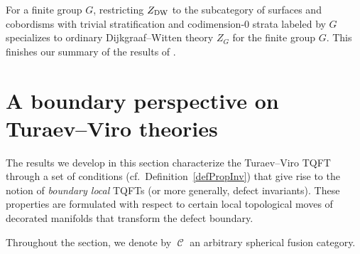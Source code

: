 \documentclass[10pt,a4paper]{amsart}
\DeclareMathOperator{\calc}{\mathcal{C}}
\numberwithin{equation}{section}
\theoremstyle{definition}
\begin{document}
For a finite group $G$, restricting $Z_{\rm DW}$ to the subcategory of surfaces and cobordisms with trivial stratification and codimension-0 strata labeled by $G$ specializes to ordinary Dijkgraaf--Witten theory $Z_G$ for the finite group $G$. This finishes our summary of the results of \cite{FMM}.

\section{A boundary perspective on Turaev--Viro theories}
\label{secTVRes}
The results we develop in this section characterize the Turaev--Viro TQFT through a set of conditions (cf.\ Definition~\ref{defPropInv}) that give rise to the notion of \textit{boundary local} TQFTs (or more generally, defect invariants). These properties are formulated with respect to certain local topological moves of decorated manifolds that transform the defect boundary.

Throughout the section, we denote by $\calc$ an arbitrary spherical fusion category.
\end{document}
